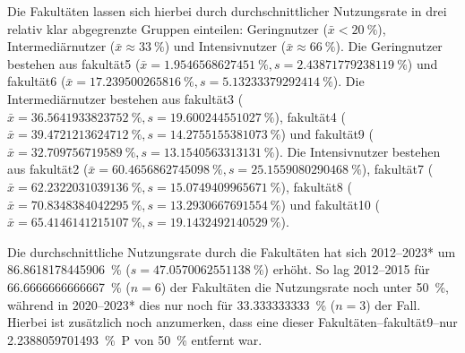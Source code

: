 Die Fakultäten lassen sich hierbei durch durchschnittlicher Nutzungsrate in drei relativ klar abgegrenzte Gruppen einteilen: Geringnutzer ($\bar{x}<\SI[round-mode=places,round-precision=2]{20}{\percent}$), Intermediärnutzer ($\bar{x}\approx\SI[round-mode=places,round-precision=2]{33}{\percent}$) und Intensivnutzer ($\bar{x}\approx\SI[round-mode=places,round-precision=2]{66}{\percent}$).
Die Geringnutzer bestehen aus \gls{fakultät5} ($\bar{x}=\SI[round-mode=places,round-precision=2]{1.9546568627451}{\percent},s=\SI[round-mode=places,round-precision=2]{2.43871779238119}{\percent}$) und \gls{fakultät6} ($\bar{x}=\SI[round-mode=places,round-precision=2]{17.239500265816}{\percent},s=\SI[round-mode=places,round-precision=2]{5.13233379292414}{\percent}$).
Die Intermediärnutzer bestehen aus \gls{fakultät3} ($\bar{x}=\SI[round-mode=places,round-precision=2]{36.5641933823752}{\percent},s=\SI[round-mode=places,round-precision=2]{19.600244551027}{\percent}$), \gls{fakultät4} ($\bar{x}=\SI[round-mode=places,round-precision=2]{39.4721213624712}{\percent},s=\SI[round-mode=places,round-precision=2]{14.2755155381073}{\percent}$) und \gls{fakultät9} ($\bar{x}=\SI[round-mode=places,round-precision=2]{32.709756719589}{\percent},s=\SI[round-mode=places,round-precision=2]{13.1540563313131}{\percent}$).
Die Intensivnutzer bestehen aus \gls{fakultät2} ($\bar{x}=\SI[round-mode=places,round-precision=2]{60.4656862745098}{\percent},s=\SI[round-mode=places,round-precision=2]{25.1559080290468}{\percent}$), \gls{fakultät7} ($\bar{x}=\SI[round-mode=places,round-precision=2]{62.2322031039136}{\percent},s=\SI[round-mode=places,round-precision=2]{15.0749409965671}{\percent}$), \gls{fakultät8} ($\bar{x}=\SI[round-mode=places,round-precision=2]{70.8348384042295}{\percent},s=\SI[round-mode=places,round-precision=2]{13.2930667691554}{\percent}$) und \gls{fakultät10} ($\bar{x}=\SI[round-mode=places,round-precision=2]{65.4146141215107}{\percent},s=\SI[round-mode=places,round-precision=2]{19.1432492140529}{\percent}$).

Die durchschnittliche Nutzungsrate durch die Fakultäten hat sich 2012--2023* um \SI[round-mode=places,round-precision=2]{86.8618178445906}{\percent} ($s=\SI[round-mode=places,round-precision=2]{47.0570062551138}{\percent}$) erhöht.
So lag 2012--2015 für \SI[round-mode=places,round-precision=2]{66,6666666666667}{\percent} ($n=\num{6}$) der Fakultäten die Nutzungsrate noch unter \SI[round-mode=places,round-precision=2]{50}{\percent}, während in 2020--2023* dies nur noch für \SI[round-mode=places,round-precision=2]{33,333333333}{\percent} ($n=\num{3}$) der Fall.
Hierbei ist zusätzlich noch anzumerken, dass eine dieser Fakultäten--\gls{fakultät9}--nur \SI[round-mode=places,round-precision=2]{2.2388059701493}{\percent P} von \SI[round-mode=places,round-precision=2]{50}{\percent} entfernt war.
\pagebreak

